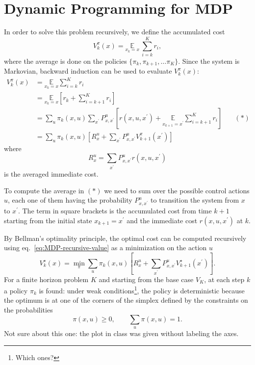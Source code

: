 \section{Dynamic Programming for MDP}
\label{sec:MDP-dynamic-programming}

In order to solve this problem recursively, we define the accumulated cost
\begin{equation*}
  V_k^\pi(x) = \underset{x_k=x}{\mathbb{E}}\ \sum_{i=k}^K r_i,
\end{equation*}
where the average is done on the policies $\{\pi_k, \pi_{k+1},\ldots \pi_K\}$. Since the system is Markovian, backward induction can be used to evaluate $V_k^\pi(x)$:
\begin{equation}
  \label{eq:MDP-recursive-value}
  \begin{aligned}
    V_k^\pi(x) &= \underset{x_k=x}{\mathbb{E}}\sum_{i=k}^K r_i \\
               &= \underset{x_k=x}{\mathbb{E}}\left[r_k + \sum_{i=k+1}^K r_i\right] \\
               &= \sum_u \pi_k(x,u)\sum_{x^\prime} P_{x,x^\prime}^u \left[r(x,u,x^\prime) + \underset{x_{k+1}=x^\prime}{\mathbb{E}}\sum_{i=k+1}^K r_i\right] & \quad (*) \\
               &= \sum_u \pi_k(x,u)\left[R^u_x + \sum_{x^\prime}P_{x,x^\prime}^u V^\pi_{k+1}(x^\prime)\right]
  \end{aligned}
\end{equation}
where
\begin{equation*}
  R^u_x = \sum_{x^\prime} P^u_{x,x^\prime}r(x,u,x^\prime)
\end{equation*}
is the averaged immediate cost.

To compute the average in $(*)$ we need to sum over the possible control actions $u$, each one of them having the probability $P_{x,x^\prime}^u$ to transition the system from $x$ to $x^\prime$. The term in square brackets is the accumulated cost from time $k+1$ starting from the initial state $x_{k+1}=x^\prime$ and the immediate cost $r(x,u,x^\prime)$ at $k$.

By Bellman's optimality principle, the optimal cost can be computed recursively using eq.~\eqref{eq:MDP-recursive-value} as a minimization on the action $u$
\begin{equation*}
  V_k^\star(x) = \min_\pi \sum_u \pi_k(x,u)\left[R^u_x + \sum_{x^\prime}P_{x,x^\prime}^u V^\star_{k+1}(x^\prime)\right].
\end{equation*}
For a finite horizon problem $K$ and starting from the base case $V_K$, at each step $k$ a policy $\pi_k$ is found: under weak conditions\footnote{Which ones?}, the policy is deterministic because the optimum is at one of the corners of the simplex defined by the constraints on the probabilities
\begin{equation*}
  \pi(x,u) \ge 0,\qquad \sum_u \pi(x,u) = 1.
\end{equation*}
Not sure about this one: the plot in class was given without labeling the axes.

